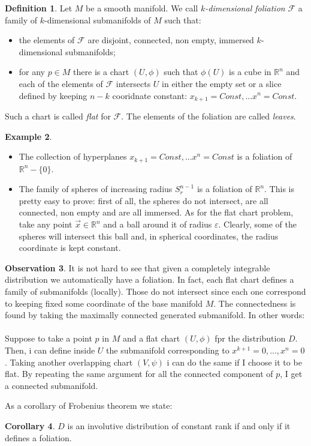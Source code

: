 \documentclass[12pt,a4paper]{report}
\theoremstyle{definition}
\newtheorem{Def}{Definition}[chapter]
\theoremstyle{Theorem}
\theoremstyle{definition}
\newtheorem{Ex}[Def]{Example}
\theoremstyle{definition}
\newtheorem{Cor}[Def]{Corollary}
\newtheorem{Obs}[Def]{Observation}
\begin{document}
 		\begin{Def}
 			Let $M$ be a smooth manifold. We call \textit{$k$-dimensional foliation} $\mathcal{F}$ a family of $k$-dimensional submanifolds of $M$ such that:
 			\begin{itemize}
 				\item the elements of $\mathcal{F}$ are disjoint, connected, non empty, immersed $k$-dimensional submanifolds;
 				\item for any $p\in M$ there is a chart $(U,\phi)$ such that $\phi(U)$ is a cube in $\mathbb{R}^n$ and each of the elements of $\mathcal{F}$ intersects $U$ in either the empty set or a slice defined by keeping $n-k$ cooridnate constant: $x_{k+1}=Const,...x^n=Const$.
 			\end{itemize}
 			Such a chart is called \textit{flat} for $\mathcal{F}$. The elements of the foliation are called \textit{leaves}.
 		\end{Def}
 		\begin{Ex}
 			\begin{itemize}
 				\item The collection of hyperplanes $x_{k+1}=Const,...x^n=Const$ is a foliation of $\mathbb{R}^n-\{0\}$.
 				\item The family of spheres of increasing radius $S^{n-1}_r$ is a foliation of $\mathbb{R}^n$. This is pretty easy to prove: first of all, the spheres do not intersect, are all connected, non empty and are all immersed. As for the flat chart problem, take any point $\vec{x}\in \mathbb{R}^n$ and a ball around it of radius $\varepsilon$. Clearly, some of the spheres will intersect this ball and, in spherical coordinates, the radius coordinate is kept constant.
 			\end{itemize}
 		\end{Ex}
 		\begin{Obs}
 			It is not hard to see that given a completely integrable distribution we automatically have a foliation. In fact, each flat chart defines a family of submanifolds (locally). Those do not intersect since each one correspond to keeping fixed some coordinate of the base manifold $M$. The connectedness is found by taking the maximally connected generated submanifold. In other words:\\
 			\\
 			Suppose to take a point $p$ in $M$ and a flat chart $(U,\phi)$ fpr the distribution $D$. Then, i can define inside $U$ the submanifold corresponding to $x^{k+1}=0,...,x^n=0$. Taking another overlapping chart $(V,\psi)$ i can do the same if I choose it to be flat. By repeating the same argument for all the connected component of $p$, I get a connected submanifold.
 		\end{Obs}
 		As a corollary of Frobenius theorem we state:
 		\begin{Cor}
 			$D$ is an involutive distribution of constant rank if and only if it defines a foliation.
 		\end{Cor}
\end{document}
